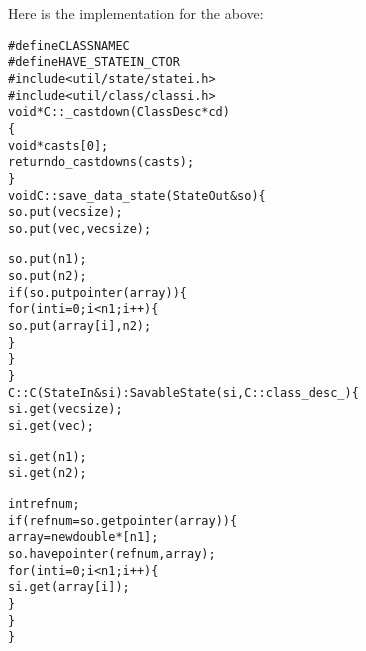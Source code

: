 Here is the implementation for the above:
\begin{alltt}
#define CLASSNAME C
#define HAVE_STATEIN_CTOR
#include <util/state/statei.h>
#include <util/class/classi.h>
void* C::_castdown(ClassDesc*cd)
  \{
  void* casts[0];
  return do_castdowns(casts);
  \}
void C::save_data_state(StateOut&so) \{
  so.put(vecsize);
  so.put(vec,vecsize);

  so.put(n1);
  so.put(n2);
  if (so.putpointer(array)) \{
    for (int i=0; i<n1; i++) \{
      so.put(array[i],n2);
      \}
    \}
  \}
C::C(StateIn&si): SavableState(si,C::class_desc_) \{
  si.get(vecsize);
  si.get(vec);

  si.get(n1);
  si.get(n2);

  int refnum;
  if (refnum = so.getpointer(array)) \{
    array = new double*[n1];
    so.havepointer(refnum,array);
    for (int i=0; i<n1; i++) \{
      si.get(array[i]);
      \}
    \}
  \}
\end{alltt}














